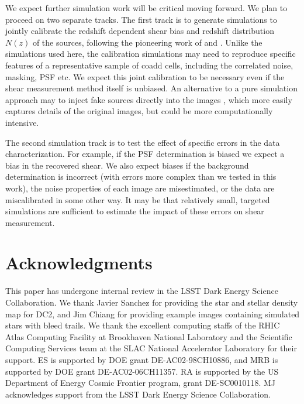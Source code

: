 \documentclass[twocolumn,twocolappendix,astrosym]{openjournal}
\begin{document}
We expect further simulation work will be critical moving forward.  We plan to
proceed on two separate tracks.  The first track is to generate simulations to
jointly calibrate the redshift dependent shear bias and redshift distribution
$N(z)$ of the sources, following the pioneering work of \cite{MacCrann2022} and
\cite{LiNofz2022}.  Unlike the simulations used here, the calibration
simulations may need to reproduce specific features of a representative sample
of coadd cells, including the correlated noise, masking, PSF etc.  We expect
this joint calibration to be necessary even if the shear measurement method
itself is unbiased.  An alternative to a pure simulation approach may to inject
fake sources directly into the images
\citep{SuchytaBalrog2016,EverettBalrog2022}, which more easily captures details
of the original images, but could be more computationally intensive.

The second simulation track is to test the effect of specific errors in the
data characterization.  For example, if the PSF determination is biased we
expect a bias in the recovered shear.  We also expect biases if the background
determination is incorrect (with errors more complex than we tested in this
work), the noise properties of each image are misestimated, or the data are
miscalibrated in some other way.  It may be that relatively small, targeted
simulations are sufficient to estimate the impact of these errors on shear
measurement.

\section*{Acknowledgments}

This paper has undergone internal review in the LSST Dark Energy Science
Collaboration. %
We thank Javier Sanchez for providing the star and stellar density map for DC2,
and Jim Chiang for providing example images containing simulated stars
with bleed trails.
We thank the excellent computing staffs of the RHIC Atlas Computing Facility at
Brookhaven National Laboratory and the Scientific Computing Services team at
the SLAC National Accelerator Laboratory for their support.
ES is supported by DOE grant DE-AC02-98CH10886, and MRB is supported by DOE
grant DE-AC02-06CH11357. RA is supported by the US Department of Energy Cosmic
Frontier program, grant DE-SC0010118.  MJ acknowledges support from the LSST
Dark Energy Science Collaboration.



%
%
%
%


\end{document}
